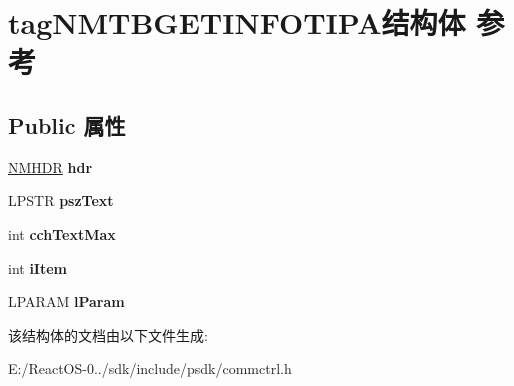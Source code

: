 \hypertarget{structtag_n_m_t_b_g_e_t_i_n_f_o_t_i_p_a}{}\section{tag\+N\+M\+T\+B\+G\+E\+T\+I\+N\+F\+O\+T\+I\+P\+A结构体 参考}
\label{structtag_n_m_t_b_g_e_t_i_n_f_o_t_i_p_a}
\subsection*{Public 属性}
\begin{DoxyCompactItemize}
\item 
\mbox{\label{structtag_n_m_t_b_g_e_t_i_n_f_o_t_i_p_a_ad9494e19c8d4362e2202b2f78d1af989}} 
\hyperlink{structtag_n_m_h_d_r}{N\+M\+H\+DR} {\bfseries hdr}
\item 
\mbox{\label{structtag_n_m_t_b_g_e_t_i_n_f_o_t_i_p_a_a59ba83f44cd4f005c81e91a5fda555f5}} 
L\+P\+S\+TR {\bfseries psz\+Text}
\item 
\mbox{\label{structtag_n_m_t_b_g_e_t_i_n_f_o_t_i_p_a_ac52183ac4862241128e476b99dd72bb8}} 
int {\bfseries cch\+Text\+Max}
\item 
\mbox{\label{structtag_n_m_t_b_g_e_t_i_n_f_o_t_i_p_a_ac343e3567107511087f177134a1491a2}} 
int {\bfseries i\+Item}
\item 
\mbox{\label{structtag_n_m_t_b_g_e_t_i_n_f_o_t_i_p_a_abf62c61ea65a7acab7b932ca74cbed8e}} 
L\+P\+A\+R\+AM {\bfseries l\+Param}
\end{DoxyCompactItemize}


该结构体的文档由以下文件生成\+:\begin{DoxyCompactItemize}
\item 
E\+:/\+React\+O\+S-\/0../sdk/include/psdk/commctrl.\+h\end{DoxyCompactItemize}
